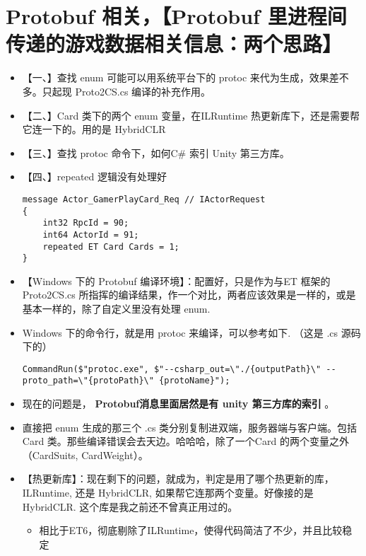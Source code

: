 \documentclass[9pt, b5paper]{article}
\begin{document}
\section{Protobuf 相关，【Protobuf 里进程间传递的游戏数据相关信息：两个思路】}
\label{sec-10}
\begin{itemize}
\item 【一、】查找 enum 可能可以用系统平台下的 protoc 来代为生成，效果差不多。只起现 Proto2CS.cs 编译的补充作用。
\item 【二、】Card 类下的两个 enum 变量，在ILRuntime 热更新库下，还是需要帮它连一下的。用的是 HybridCLR
\item 【三、】查找 protoc 命令下，如何C\# 索引 Unity 第三方库。
\item 【四、】repeated 逻辑没有处理好
\begin{verbatim}
message Actor_GamerPlayCard_Req // IActorRequest
{
	int32 RpcId = 90;
	int64 ActorId = 91;
    repeated ET Card Cards = 1;
}
\end{verbatim}
\item 【Windows 下的 Protobuf 编译环境】：配置好，只是作为与ET 框架的Proto2CS.cs 所指挥的编译结果，作一个对比，两者应该效果是一样的，或是基本一样的，除了自定义里没有处理 enum.
\item Windows 下的命令行，就是用 protoc 来编译，可以参考如下. （这是 .cs 源码下的）
\begin{verbatim}
CommandRun($"protoc.exe", $"--csharp_out=\"./{outputPath}\" --proto_path=\"{protoPath}\" {protoName}");
\end{verbatim}
\item 现在的问题是， \textbf{Protobuf消息里面居然是有 unity 第三方库的索引} 。
\item 直接把 enum 生成的那三个 .cs 类分别复制进双端，服务器端与客户端。包括Card 类。那些编译错误会去天边。哈哈哈，除了一个Card 的两个变量之外（CardSuits, CardWeight）。
\item 【热更新库】：现在剩下的问题，就成为，判定是用了哪个热更新的库，ILRuntime, 还是 HybridCLR, 如果帮它连那两个变量。好像接的是 HybridCLR. 这个库是我之前还不曾真正用过的。
\begin{itemize}
\item 相比于ET6，彻底剔除了ILRuntime，使得代码简洁了不少，并且比较稳定
\end{itemize}
\end{itemize}
\end{document}
